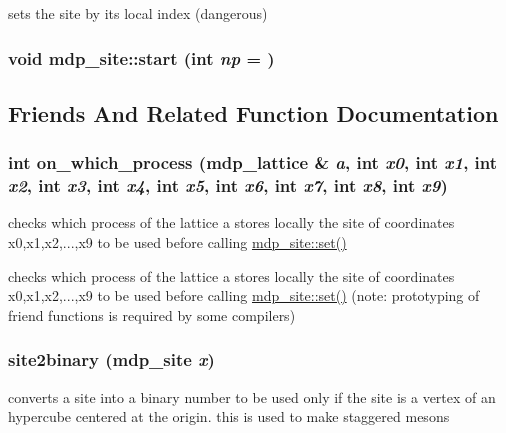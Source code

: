 sets the site by its local index (dangerous) \hypertarget{classmdp__site_a67f09ac8f2c14dc4461120244443532e}{
\subsubsection[{start}]{\setlength{\rightskip}{0pt plus 5cm}void mdp\_\-site::start (int {\em np} = {})}}
\label{classmdp__site_a67f09ac8f2c14dc4461120244443532e}


\subsection{Friends And Related Function Documentation}
\hypertarget{classmdp__site_ac96405ecdb78dc33d55edea04876a931}{
\subsubsection[{on\_\-which\_\-process}]{\setlength{\rightskip}{0pt plus 5cm}int on\_\-which\_\-process ({\bf mdp\_\-lattice} \& {\em a}, \/  int {\em x0}, \/  int {\em x1}, \/  int {\em x2}, \/  int {\em x3}, \/  int {\em x4}, \/  int {\em x5}, \/  int {\em x6}, \/  int {\em x7}, \/  int {\em x8}, \/  int {\em x9})}}
\label{classmdp__site_ac96405ecdb78dc33d55edea04876a931}
checks which process of the lattice a stores locally the site of coordinates x0,x1,x2,...,x9 to be used before calling \hyperlink{classmdp__site_a241eb259576cbe7354d1ff714d22416c}{mdp\_\-site::set()}

checks which process of the lattice a stores locally the site of coordinates x0,x1,x2,...,x9 to be used before calling \hyperlink{classmdp__site_a241eb259576cbe7354d1ff714d22416c}{mdp\_\-site::set()} (note: prototyping of friend functions is required by some compilers) \hypertarget{classmdp__site_a03c9871dd1382a293be5394fafda9718}{
\subsubsection[{site2binary}]{ site2binary ({\bf mdp\_\-site} {\em x})}}
\label{classmdp__site_a03c9871dd1382a293be5394fafda9718}
converts a site into a binary number to be used only if the site is a vertex of an hypercube centered at the origin. this is used to make staggered mesons 

